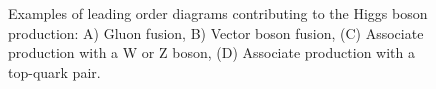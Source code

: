 \begin{figure}[ht!]
\captionsetup[subfigure]{justification=centering}
\centering
{}
\\
\\
\caption[Examples of leading order diagrams contributing to the Higgs boson production]{Examples of leading order diagrams contributing to the Higgs boson production: A) Gluon fusion, B) Vector boson fusion, (C) Associate production with a W or Z boson, (D) Associate production with a top-quark pair.}
\label{fig:hdiagrams}
\end{figure}

